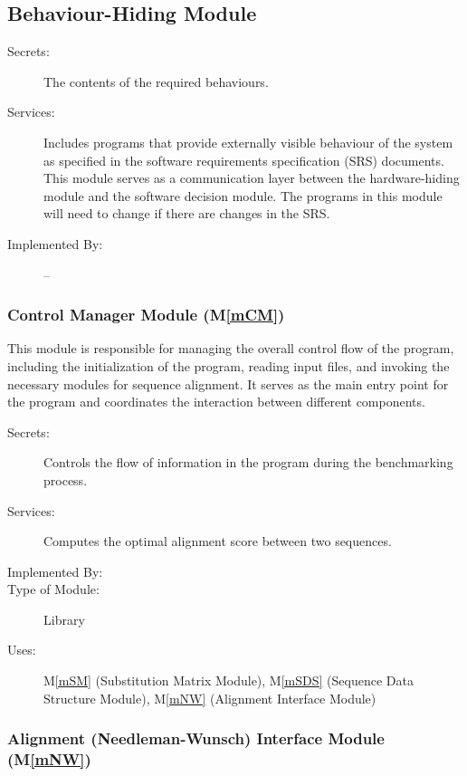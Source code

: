 \documentclass[12pt, titlepage]{article}
\newcommand{\mref}[1]{M\ref{#1}}
\begin{document}
\subsection{Behaviour-Hiding Module}

\begin{description}
\item[Secrets:]The contents of the required behaviours.
\item[Services:]Includes programs that provide externally visible behaviour of
  the system as specified in the software requirements specification (SRS)
  documents. This module serves as a communication layer between the
  hardware-hiding module and the software decision module. The programs in this
  module will need to change if there are changes in the SRS.
\item[Implemented By:] --
\end{description}

\subsubsection{Control Manager Module (\mref{mCM})}
This module is responsible for managing the overall control flow of the
program, including the initialization of the program, reading input files, and invoking the necessary modules for sequence alignment. It serves as the main entry point for the program and coordinates the interaction between different components.
\begin{description}
\item[Secrets:] Controls the flow of information in the program during the benchmarking process.
\item[Services:] Computes the optimal alignment score between two sequences.
\item[Implemented By:] \progname{}
\item[Type of Module:] Library
\item[Uses:] \mref{mSM} (Substitution Matrix Module), \mref{mSDS} (Sequence Data Structure Module), \mref{mNW} (Alignment Interface Module)
\end{description}


\subsubsection{Alignment (Needleman-Wunsch) Interface Module (\mref{mNW})}
\end{document}
